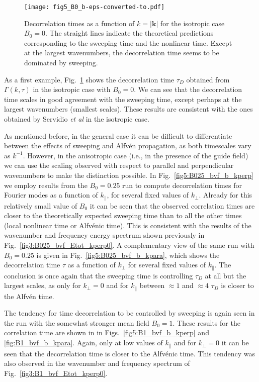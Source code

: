 \documentclass[aip,pop,reprint,amsmath,amssymb,floatfix]{revtex4-1}
\renewcommand{\vec}[1]{\mathbf{#1}}
\begin{document}
\begin{figure}
  \texttt{[image: fig5\_B0\_b-eps-converted-to.pdf]}
  \caption{Decorrelation times as a function of $k=|\vec{k}|$ for the
    isotropic case $B_0=0$. The straight lines indicate the
    theoretical predictions corresponding to the sweeping time and the
    nonlinear time. Except at the largest wavenumbers, the
    decorrelation time seems to be dominated by sweeping.}
  \label{fig5:B0_bvf_b_kpara_0}
\end{figure}

As a first example, Fig.~\ref{fig5:B0_bvf_b_kpara_0} shows the
decorrelation time $\tau_D$ obtained from $\Gamma(k,\tau)$ in the
isotropic case with $B_0=0$. We can see that the decorrelation time
scales in good agreement with the sweeping time, except perhaps at the
largest wavenumbers (smallest scales). These results are consistent
with the ones obtained by Servidio {\it et al}
\cite{servidio_time_2011} in the isotropic case.

As mentioned before, in the general case it can be difficult to
differentiate between the effects of sweeping and Alfv\'en
propagation, as both timescales vary as $k^{-1}$. However, in the
anisotropic case (i.e., in the presence of the guide field) we can use
the scaling observed with respect to parallel and perpendicular
wavenumbers to make the distinction possible. In 
Fig.~\ref{fig5:B025_bvf_b_kperp} we employ
results from the $B_0=0.25$ run to compute decorrelation times for
Fourier modes as a function of $k_\parallel$, for several fixed values
of $k_\perp$. Already for this relatively small value of $B_0$ it can
be seen that the observed correlation times are closer to 
the theoretically expected sweeping time than to all the other times
(local nonlinear time or Alfv\'enic time). This is consistent with the
results of the wavenumber and frequency energy spectrum shown
previously in Fig.~\ref{fig3:B025_bvf_Etot_kperp0}. A complementary
view of the same run with $B_0=0.25$ is given in 
Fig.~\ref{fig5:B025_bvf_b_kpara}, which shows the decorrelation time
$\tau$ as a function of $k_\perp$ for several fixed values of
$k_\parallel$. The conclusion is once again that the sweeping time is
controlling $\tau_D$ at all but the largest scales, as only for
$k_\perp=0$ and for $k_\parallel$ between $\approx 1$ and $\approx 4$
$\tau_D$ is closer to the Alfv\'en time.

The tendency for time decorrelation to be controlled by sweeping is
again seen in the run with the somewhat stronger mean field $B_0=1$.
These results for the correlation time are shown in in 
Figs.~\ref{fig5:B1_bvf_b_kperp} and \ref{fig:B1_bvf_b_kpara}. Again, only at low
values of $k_{\parallel}$ and for $k_{\perp}=0$ it can be seen that the
decorrelation time is closer to the Alfv\'enic time. This tendency was
also observed in the wavenumber and frequency spectrum of 
Fig.~\ref{fig3:B1_bvf_Etot_kperp0}.
\end{document}
